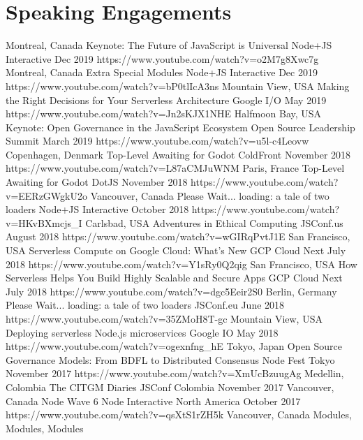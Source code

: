 \documentclass[10pt,a4paper,sans]{moderncv}   %
\begin{document}
\section{Speaking Engagements}
\cventry
  {Montreal, Canada}
  {Keynote: The Future of JavaScript is Universal}
  {Node+JS Interactive}
  {Dec 2019}{}
  {https://www.youtube.com/watch?v=o2M7g8Xwc7g}
\cventry
  {Montreal, Canada}
  {Extra Special Modules}
  {Node+JS Interactive}
  {Dec 2019}{}
  {https://www.youtube.com/watch?v=bP0tlIcA3ns}
\cventry
  {Mountain View, USA}
  {Making the Right Decisions for Your Serverless Architecture}
  {Google I/O}
  {May 2019}{}
  {https://www.youtube.com/watch?v=Jn2sKJX1NHE}
\cventry
  {Halfmoon Bay, USA}
  {Keynote: Open Governance in the JavaScript Ecosystem}
  {Open Source Leadership Summit}
  {March 2019}{}
  {https://www.youtube.com/watch?v=u5l-c4Leovw}
\cventry
  {Copenhagen, Denmark}
  {Top-Level Awaiting for Godot}
  {ColdFront}
  {November 2018}{}
  {https://www.youtube.com/watch?v=L87aCMJuWNM}
\cventry
  {Paris, France}
  {Top-Level Awaiting for Godot}
  {DotJS}
  {November 2018}{}
  {https://www.youtube.com/watch?v=EERzGWgkU2o}
\cventry
  {Vancouver, Canada}
  {Please Wait... loading: a tale of two loaders}
  {Node+JS Interactive}
  {October 2018}{}
  {https://www.youtube.com/watch?v=HKvBXmcjs\_I}
\cventry
  {Carlsbad, USA}
  {Adventures in Ethical Computing}
  {JSConf.us}
  {August 2018}{}
  {https://www.youtube.com/watch?v=wGIRqPvtJ1E}
\cventry
  {San Francisco, USA}
  {Serverless Compute on Google Cloud: What's New}
  {GCP Cloud Next}
  {July 2018}{}
  {https://www.youtube.com/watch?v=Y1sRy0Q2qig}
\cventry
  {San Francisco, USA}
  {How Serverless Helps You Build Highly Scalable and Secure Apps}
  {GCP Cloud Next}
  {July 2018}{}
  {https://www.youtube.com/watch?v=dgc5Eeir2S0}
\cventry
  {Berlin, Germany}
  {Please Wait... loading: a tale of two loaders}
  {JSConf.eu}
  {June 2018}{}
  {https://www.youtube.com/watch?v=35ZMoH8T-gc}
\cventry
  {Mountain View, USA}
  {Deploying serverless Node.js microservices}
  {Google I\/O}
  {May 2018}{}
  {https://www.youtube.com/watch?v=ogexnfng\_hE}
\cventry
  {Tokyo, Japan}
  {Open Source Governance Models: From BDFL to Distributed Consensus}
  {Node Fest Tokyo}
  {November 2017}{}
  {https://www.youtube.com/watch?v=XmUcBzuugAg}
\cventry
  {Medellin, Colombia}
  {The CITGM Diaries}
  {JSConf Colombia}
  {November 2017}{}
  {}
\cventry
  {Vancouver, Canada}
  {Node Wave 6}
  {Node Interactive North America}
  {October 2017}{}
  {https://www.youtube.com/watch?v=qsXtS1rZH5k}
\cventry
  {Vancouver, Canada}
  {Modules, Modules, Modules}
\end{document}
